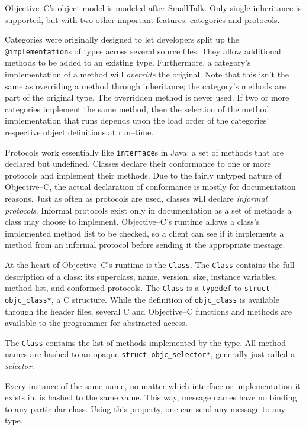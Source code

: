 	Objective--C's object model is modeled after SmallTalk.  Only single inheritance is supported, but with two other important features: categories and protocols.

	Categories were originally designed to let developers split up the \texttt{@impl\-em\-ent\-at\-ion}s of types across several source files.  They allow additional methods to be added to an existing type.  Furthermore, a category's implementation of a method will \emph{override} the original.  Note that this isn't the same as overriding a method through inheritance; the category's methods are part of the original type.  The overridden method is never used. If two or more categories implement the same method, then the selection of the method implementation that runs depends upon the load order of the categories' respective object definitions at run--time.

	Protocols work essentially like \texttt{interface}s in Java: a set of methods that are declared but undefined.  Classes declare their conformance to one or more protocols and implement their methods.  Due to the fairly untyped nature of Objective--C, the actual declaration of conformance is mostly for documentation reasons.  Just as often as protocols are used, classes will declare \emph{informal protocols}.  Informal protocols exist only in documentation as a set of methods a class may choose to implement.  Objective--C's runtime allows a class's implemented method list to be checked, so a client can see if it implements a method from an informal protocol before sending it the appropriate message.

	At the heart of Objective--C's runtime is the \texttt{Class}.  The \texttt{Class} contains the full description of a class: its superclass, name, version, size, instance variables, method list, and conformed protocols.  The \texttt{Class} is a \texttt{typedef} to \texttt{struct objc\_class*}, a C structure.  While the definition of \texttt{objc\_class} is available through the header files, several C and Objective--C functions and methods are available to the programmer for abstracted access.

	The \texttt{Class} contains the list of methods implemented by the type.  All method names are hashed to an opaque \texttt{struct objc\_selector*}, generally just called a \emph{selector}.  

	Every instance of the same name, no matter which interface or implementation it exists in, is hashed to the same value.  This way, message names have no binding to any particular class.  Using this property, one can send any message to any type.

